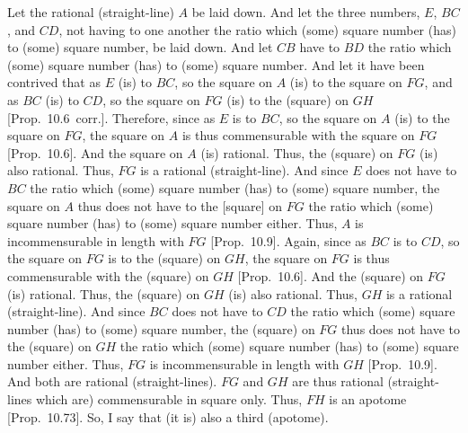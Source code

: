 \begin{Parallel}{}{}
{Let the rational (straight-line) $A$ be laid down. And let the
three numbers, $E$, $BC$, and $CD$, not having to one another
the ratio which (some) square number (has) to (some) square number,
be laid down. And let $CB$ have to $BD$ the ratio which (some)
square number (has) to (some) square number. And let it have been
contrived that as $E$ (is) to $BC$, so the square on $A$ (is) to the square
on $FG$, and as $BC$ (is) to $CD$, so the square on $FG$ (is) to the (square)
on $GH$ [Prop.~10.6~corr.]. Therefore,
since  as $E$ is to $BC$, so the square on $A$ (is) to the square on
$FG$, the square on $A$ is thus commensurable with the square on
$FG$ [Prop.~10.6]. And the square on $A$
(is) rational. Thus, the (square) on $FG$ (is) also rational. Thus,
$FG$ is a rational (straight-line). And since  $E$ does not have to $BC$
the ratio which (some) square number (has) to (some) square number,
the square on $A$ thus does not have to the [square] on $FG$ the ratio
which (some) square number (has) to (some) square number either. Thus,
$A$ is incommensurable in length with $FG$ [Prop.~10.9]. Again, since as $BC$ is to $CD$, so
the square on $FG$ is to the (square) on $GH$, the square on $FG$
is thus commensurable with the (square) on $GH$ [Prop.~10.6]. And the (square) on $FG$ (is)
rational. Thus, the (square) on $GH$ (is) also rational. Thus, $GH$ is
a rational (straight-line). And since $BC$ does not have to $CD$ the
ratio which (some) square number (has) to (some) square number, the
(square) on $FG$ thus does not have to the (square) on $GH$ the
ratio which (some) square number (has) to (some) square number either.
Thus, $FG$ is incommensurable in length with $GH$ [Prop.~10.9]. And both are rational (straight-lines).
$FG$ and $GH$ are thus rational (straight-lines which are) commensurable
in square only. Thus, $FH$ is an apotome [Prop.~10.73]. So, I say that (it is) also a third
(apotome).

}
\end{Parallel}
